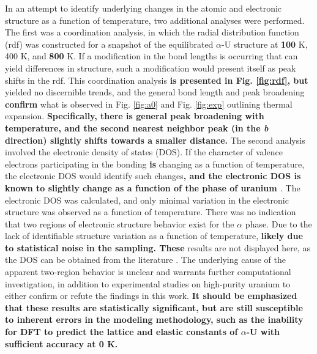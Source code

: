 \documentclass[utf8]{frontiersSCNS} %
\providecommand{\DIFaddtex}[1]{{\bf #1}} %
\providecommand{\DIFdeltex}[1]{} %
\providecommand{\DIFaddbegin}{\protect\color{blue}} %
\providecommand{\DIFaddend}{\protect\color{black}} %
\providecommand{\DIFdelbegin}{\protect\color{red}} %
\providecommand{\DIFdelend}{\protect\color{black}} %
\providecommand{\DIFadd}[1]{\texorpdfstring{\DIFaddtex{#1}}{#1}} %
\providecommand{\DIFdel}[1]{\texorpdfstring{\DIFdeltex{#1}}{}} %
\begin{document}
In an attempt to identify underlying changes in the atomic and electronic structure as a function of temperature, two additional analyses were performed. The first was a coordination analysis, in which the radial distribution function (rdf) was constructed for a snapshot of the equilibrated $\alpha$-U structure at \DIFdelbegin \DIFdel{200 }\DIFdelend \DIFaddbegin \DIFadd{100 }\DIFaddend K, 400 K, and \DIFdelbegin \DIFdel{700 }\DIFdelend \DIFaddbegin \DIFadd{800 }\DIFaddend K. If a modification in the bond lengths is occurring that can yield differences in structure, such a modification would present itself as peak shifts in the rdf. This coordination analysis \DIFaddbegin \DIFadd{is presented in Fig. \ref{fig:rdf}, but }\DIFaddend yielded no discernible trends, and the general bond length and peak broadening \DIFdelbegin \DIFdel{confirms }\DIFdelend \DIFaddbegin \DIFadd{confirm }\DIFaddend what is observed in Fig. \ref{fig:a0} and Fig. \ref{fig:exp} outlining thermal expansion. \DIFaddbegin \DIFadd{Specifically, there is general peak broadening with temperature, and the second nearest neighbor peak (in the \textit{b} direction) slightly shifts towards a smaller distance. }\DIFaddend The second analysis involved the electronic density of states (DOS). If the character of valence electrons participating in the bonding \DIFdelbegin \DIFdel{are }\DIFdelend \DIFaddbegin \DIFadd{is }\DIFaddend changing as a function of temperature, the electronic DOS would identify such changes\DIFaddbegin \DIFadd{, and the electronic DOS is known to slightly change as a function of the phase of uranium \cite{beeler2013}}\DIFaddend . The electronic DOS was calculated, and only minimal variation in the electronic structure was observed as a function of temperature. There was no indication that two regions of electronic structure behavior exist for the $\alpha$ phase. Due to the lack of identifiable structure variation as a function of temperature, \DIFdelbegin \DIFdel{these }\DIFdelend \DIFaddbegin \DIFadd{likely due to statistical noise in the sampling. These }\DIFaddend results are not displayed here, as the DOS \DIFdelbegin \DIFdel{and rdf }\DIFdelend can be obtained from the literature \cite{beeler2013,hood2008}. The underlying cause of the apparent two-region behavior is unclear \DIFdelbegin \DIFdel{, }\DIFdelend and warrants further computational investigation, in addition to experimental studies on high-purity uranium to either confirm or refute the findings in this work. \DIFaddbegin \DIFadd{It should be emphasized that these results are statistically significant, but are still susceptible to inherent errors in the modeling methodology, such as the inability for DFT to predict the lattice and elastic constants of $\alpha$-U with sufficient accuracy at 0 K. 
}\DIFaddend 
\end{document}
